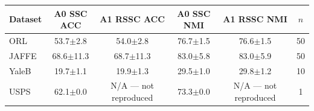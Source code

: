 \begin{tabular}{lccccc}
\toprule
Dataset & A0 SSC ACC & A1 RSSC ACC & A0 SSC NMI & A1 RSSC NMI & $n$ \\
\midrule
ORL & 53.7$\pm$2.8 & 54.0$\pm$2.8 & 76.7$\pm$1.5 & 76.6$\pm$1.5 & 50 \\
JAFFE & 68.6$\pm$11.3 & 68.7$\pm$11.3 & 83.0$\pm$5.8 & 83.0$\pm$5.9 & 50 \\
YaleB & 19.7$\pm$1.1 & 19.9$\pm$1.3 & 29.5$\pm$1.0 & 29.8$\pm$1.2 & 10 \\
USPS & 62.1$\pm$0.0 & N/A --- not reproduced & 73.3$\pm$0.0 & N/A --- not reproduced & 1 \\
\bottomrule
\end{tabular}
